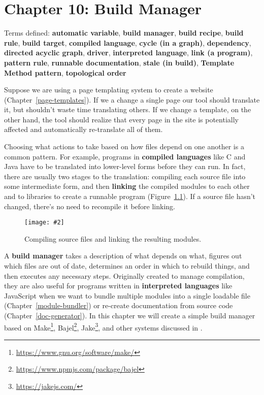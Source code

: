 \documentclass[krantzl]{krantz}
\newcommand{\figpdf}[4]{\begin{figure}%
\centering%
\texttt{[image: \#2]}%
\caption{#3}%
\label{#1}%
\end{figure}}
\newcommand{\chapref}[1]{Chapter~\ref{#1}}
\newcommand{\figref}[1]{Figure~\ref{#1}}
\newcommand{\glossref}[1]{\textbf{#1}}
\newcommand{\hreffoot}[2]{{#1}\footnote{\href{#2}{#2}}}
\begin{document}
\chapter{Chapter 10: Build Manager}\label{build-manager}


\noindent 
    Terms defined:
    \glossref{automatic variable}, \glossref{build manager}, \glossref{build recipe}, \glossref{build rule}, \glossref{build target}, \glossref{compiled language}, \glossref{cycle (in a graph)}, \glossref{dependency}, \glossref{directed acyclic graph}, \glossref{driver}, \glossref{interpreted language}, \glossref{link (a program)}, \glossref{pattern rule}, \glossref{runnable documentation}, \glossref{stale (in build)}, \glossref{Template Method pattern}, \glossref{topological order}



Suppose we are using a page templating system to create a website (\chapref{page-templates}).
If we a change a single page our tool should translate it,
but shouldn't waste time translating others.
If we change a template,
on the other hand,
the tool should realize that every page in the site is potentially affected
and automatically re-translate all of them.


Choosing what actions to take based on how files depend on one another is a common pattern.
For example,
programs in \glossref{compiled languages}
like C and Java
have to be translated into lower-level forms before they can run.
In fact,
there are usually two stages to the translation:
compiling each source file into some intermediate form,
and then \glossref{linking} the compiled modules
to each other and to libraries
to create a runnable program
(\figref{build-manager-compiling}).
If a source file hasn't changed,
there's no need to recompile it before linking.

\figpdf{build-manager-compiling}{./build-manager/compiling.pdf}{Compiling source files and linking the resulting modules.}{0.6}


A \glossref{build manager} takes a description of what depends on what,
figures out which files are out of date,
determines an order in which to rebuild things,
and then executes any necessary steps.
Originally created to manage compilation,
they are also useful for programs written in \glossref{interpreted languages}
like JavaScript
when we want to bundle multiple modules into a single loadable file (\chapref{module-bundler})
or re-create documentation from source code (\chapref{doc-generator}).
In this chapter we will create a simple build manager
based on \hreffoot{Make}{https://www.gnu.org/software/make/}, \hreffoot{Bajel}{https://www.npmjs.com/package/bajel}, \hreffoot{Jake}{https://jakejs.com/},
and other systems discussed in \cite{Smith2011}.
\end{document}
